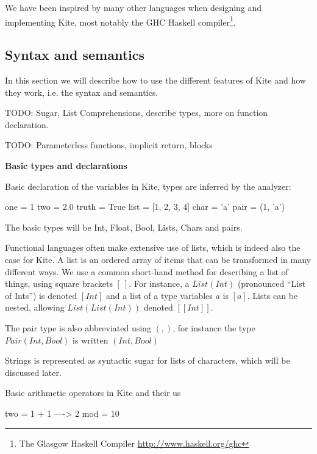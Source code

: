 We have been inspired by many other languages when designing and
implementing Kite, most notably the GHC Haskell compiler\footnote{The
  Glasgow Haskell Compiler \url{http://www.haskell.org/ghc}}.

\subsection{Syntax and semantics}
In this section we will describe how to use the different features of Kite and how they work, i.e. the syntax and semantics.

TODO: Sugar, List Comprehensions, describe types, more on function declaration.

TODO: Parameterless functions, implicit return, blocks

\textbf{Basic types and declarations}

Basic declaration of the variables in Kite, types are inferred by the analyzer:
\begin{kite}
  
  one = 1
  two = 2.0
  truth = True
  list = [1, 2, 3, 4]
  char = 'a' 
  pair = (1, 'a')
\end{kite}

The basic types will be Int, Float, Bool, Lists, Chars and
pairs.

Functional languages often make extensive use of lists, which is
indeed also the case for Kite. A list is an ordered array of items
that can be transformed in many different ways. We use a common
short-hand method for describing a list of things, using square
brackets $[\ ]$. For instance, a $List(Int)$ (pronounced ``List of
Ints'') is denoted $[Int]$ and a list of a type variables $a$ is
$[a]$. Lists can be nested, allowing $List(List(Int))$ denoted
$[[Int]]$.

The pair type is also abbreviated using $(,)$, for instance the type
$Pair(Int, Bool)$ is written $(Int, Bool)$

Strings is represented as syntactic sugar for lists of characters,
which will be discussed later.

Basic arithmetic operators in Kite and their us
\begin{kite}

  two = 1 + 1  ---->  2
  mod = 10 %
\end{kite}

